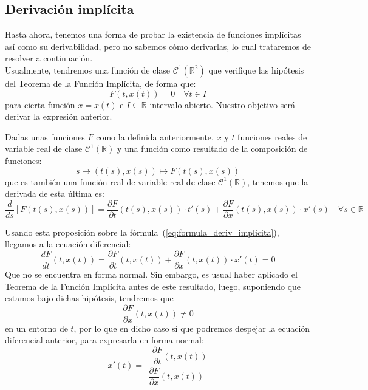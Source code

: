 \subsection{Derivación implícita}
Hasta ahora, tenemos una forma de probar la existencia de funciones implícitas así como su derivabilidad, pero no sabemos cómo derivarlas, lo cual trataremos de resolver a continuación.\\

\noindent
Usualmente, tendremos una función
de clase $\mathcal{C}^1(\mathbb{R}^2)$ que verifique las hipótesis del Teorema de la Función Implícita, de forma que:
\begin{equation}\label{eq:formula_deriv_implicita}
    F(t,x(t)) = 0 \quad \forall t\in I
\end{equation}
para cierta función $x=x(t)$ e $I\subseteq \mathbb{R}$ intervalo abierto. Nuestro objetivo será derivar la expresión anterior.

\begin{prop}
    Dadas unas funciones $F$ como la definida anteriormente, $x$ y $t$ funciones reales de variable real de clase $\mathcal{C}^1(\mathbb{R})$ y una función como resultado de la composición de funciones:
    \begin{equation*}
        s \longmapsto (t(s), x(s)) \longmapsto F(t(s), x(s))
    \end{equation*}
    que es también una función real de variable real de clase $\mathcal{C}^1(\mathbb{R})$, tenemos que la derivada de esta última es:
    \begin{equation*}
        \dfrac{d}{ds}[ F(t(s),x(s))] = \dfrac{\partial F}{\partial t}(t(s), x(s))\cdot t'(s) + \dfrac{\partial F}{\partial x}(t(s),x(s))\cdot x'(s) \quad \forall s\in \mathbb{R}
    \end{equation*}
\end{prop}

\noindent
Usando esta proposición sobre la fórmula~(\ref{eq:formula_deriv_implicita}), llegamos a la ecuación diferencial:
\begin{equation*}
    \dfrac{dF}{dt}(t,x(t)) = \dfrac{\partial F}{\partial t}(t,x(t)) + \dfrac{\partial F}{\partial x}(t,x(t))\cdot x'(t) = 0
\end{equation*}
Que no se encuentra en forma normal. Sin embargo, es usual haber aplicado el Teorema de la Función Implícita antes de este resultado, luego, suponiendo que estamos bajo dichas hipótesis, tendremos que 
\begin{equation*}
    \dfrac{\partial F}{\partial x}(t,x(t)) \neq 0
\end{equation*}
en un entorno de $t$, por lo que en dicho caso sí que podremos despejar la ecuación diferencial anterior, para expresarla en forma normal:
\begin{equation*}
    x'(t) = \dfrac{-\dfrac{\partial F}{\partial t}(t,x(t))}{\dfrac{\partial F}{\partial x}(t,x(t))}
\end{equation*}

